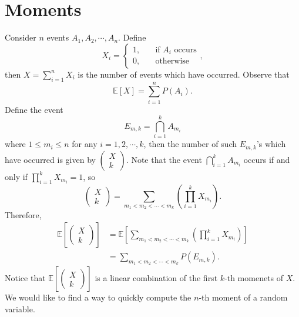 \documentclass[math, code]{amznotes}
\theoremstyle{remark}
\begin{document}
\section{Moments}
Consider $n$ events $A_1, A_2, \cdots, A_n$. Define
\begin{equation*}
    X_i = \begin{cases}
        1, & \quad\textrm{if } A_i \textrm{ occurs} \\
        0, & \quad\textrm{otherwise}
    \end{cases},
\end{equation*}
then $X = \sum_{i = 1}^{n}X_i$ is the number of events which have occurred. Observe that
\begin{equation*}
    \mathbb{E}\left[X\right] = \sum_{i = 1}^{n}P\left(A_i\right).
\end{equation*}
Define the event
\begin{equation*}
    E_{m, k} = \bigcap_{i = 1}^{k}A_{m_i}
\end{equation*}
where $1 \leq m_i \leq n$ for any $i = 1, 2, \cdots, k$, then the number of such $E_{m, k}$'s which have occurred is given by $\left(\begin{smallmatrix}
    X \\
    k
\end{smallmatrix}\right)$. Note that the event $\bigcap_{i = 1}^{k}A_{m_i}$ occurs if and only if $\prod_{i = 1}^{k}X_{m_i} = 1$, so
\begin{equation*}
    \begin{pmatrix}
        X \\
        k
    \end{pmatrix} = \sum_{m_1 < m_2 < \cdots < m_k}\left(\prod_{i = 1}^{k}X_{m_i}\right).
\end{equation*}
Therefore, 
\begin{align*}
    \mathbb{E}\left[\begin{pmatrix}
        X \\
        k
    \end{pmatrix}\right] & = \mathbb{E}\left[\sum_{m_1 < m_2 < \cdots < m_k}\left(\prod_{i = 1}^{k}X_{m_i}\right)\right] \\
    & = \sum_{m_1 < m_2 < \cdots < m_k}P\left(E_{m, k}\right).
\end{align*}
Notice that $\mathbb{E}\left[\left(\begin{smallmatrix}
    X \\
    k
\end{smallmatrix}\right)\right]$ is a linear combination of the first $k$-th momenets of $X$. We would like to find a way to quickly compute the $n$-th moment of a random variable.
\end{document}
